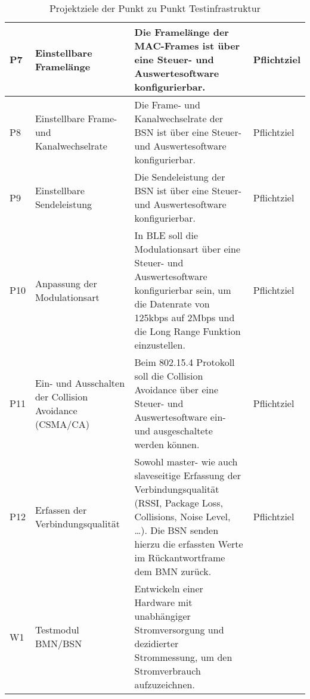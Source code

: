\begin{table}[H]
\begin{tabular}{ | C{0.7cm} | p{2.8cm} | p{8.2cm} | C{2.5cm} |}
		P7 & Einstellbare Framelänge & Die Framelänge der MAC-Frames ist über eine Steuer- und Auswertesoftware konfigurierbar. & Pflichtziel\\ \hline
		
		P8 & Einstellbare Frame- und Kanalwechselrate& Die Frame- und Kanalwechselrate der BSN ist über eine Steuer- und Auswertesoftware konfigurierbar. & Pflichtziel\\ \hline
		
		P9 & Einstellbare Sendeleistung & Die Sendeleistung der BSN ist über eine Steuer- und Auswertesoftware konfigurierbar. & Pflichtziel\\ \hline
		
		P10 & Anpassung der Modulationsart& In BLE soll die Modulationsart über eine Steuer- und Auswertesoftware konfigurierbar sein, um die Datenrate von 125kbps auf 2Mbps und die Long Range Funktion einzustellen. & Pflichtziel\\ \hline
		
		P11 & Ein- und Ausschalten der Collision Avoidance (CSMA/CA)& Beim 802.15.4 Protokoll soll die Collision Avoidance über eine Steuer- und Auswertesoftware ein- und ausgeschaltete werden können. & Pflichtziel\\ \hline
		
		P12 & Erfassen der Verbindungsqualität & Sowohl master- wie auch slaveseitige Erfassung der Verbindungsqualität (RSSI, Package Loss, Collisions, Noise Level, …). Die BSN senden hierzu die erfassten Werte im Rückantwortframe dem BMN zurück. & Pflichtziel\\ \hline
		
		W1 & Testmodul BMN/BSN & Entwickeln einer Hardware mit unabhängiger Stromversorgung und dezidierter Strommessung, um den Stromverbrauch aufzuzeichnen. \\ \hline
		
	\end{tabular}\\
	\caption{Projektziele der Punkt zu Punkt Testinfrastruktur}
	\label{tab:ProjektzielederPunktzuPunktTestinfrastruktur}
\end{table}


